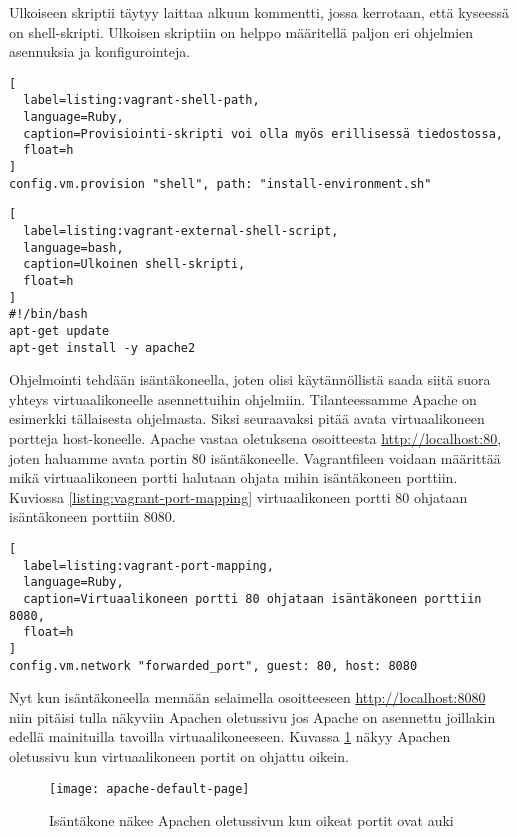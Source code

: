 Ulkoiseen skriptii täytyy laittaa alkuun kommentti, jossa kerrotaan, että kyseessä on shell-skripti. Ulkoisen skriptiin on helppo määritellä paljon eri ohjelmien asennuksia ja konfigurointeja.

\begin{lstlisting}[
  label=listing:vagrant-shell-path,
  language=Ruby,
  caption=Provisiointi-skripti voi olla myös erillisessä tiedostossa,
  float=h
]
config.vm.provision "shell", path: "install-environment.sh"
\end{lstlisting}

\begin{lstlisting}[
  label=listing:vagrant-external-shell-script,
  language=bash,
  caption=Ulkoinen shell-skripti,
  float=h
]
#!/bin/bash
apt-get update
apt-get install -y apache2
\end{lstlisting}

Ohjelmointi tehdään isäntäkoneella, joten olisi käytännöllistä saada siitä suora yhteys virtuaalikoneelle asennettuihin ohjelmiin. Tilanteessamme Apache on esimerkki tällaisesta ohjelmasta. Siksi seuraavaksi pitää avata virtuaalikoneen portteja host-koneelle. Apache vastaa oletuksena osoitteesta \url{http://localhost:80}, joten haluamme avata portin 80 isäntäkoneelle. Vagrantfileen voidaan määrittää mikä virtuaalikoneen portti halutaan ohjata mihin isäntäkoneen porttiin. Kuviossa \ref{listing:vagrant-port-mapping} virtuaalikoneen portti 80 ohjataan isäntäkoneen porttiin 8080.

\begin{lstlisting}[
  label=listing:vagrant-port-mapping,
  language=Ruby,
  caption=Virtuaalikoneen portti 80 ohjataan isäntäkoneen porttiin 8080,
  float=h
]
config.vm.network "forwarded_port", guest: 80, host: 8080
\end{lstlisting}

Nyt kun isäntäkoneella mennään selaimella osoitteeseen \url{http://localhost:8080} niin pitäisi tulla näkyviin Apachen oletussivu jos Apache on asennettu joillakin edellä mainituilla tavoilla virtuaalikoneeseen. Kuvassa \ref{fig:apache-default-page} näkyy Apachen oletussivu kun virtuaalikoneen portit on ohjattu oikein.

\begin{figure}[h]
  \texttt{[image: apache-default-page]}
  \caption{Isäntäkone näkee Apachen oletussivun kun oikeat portit ovat auki}
  \label{fig:apache-default-page}
\end{figure}

